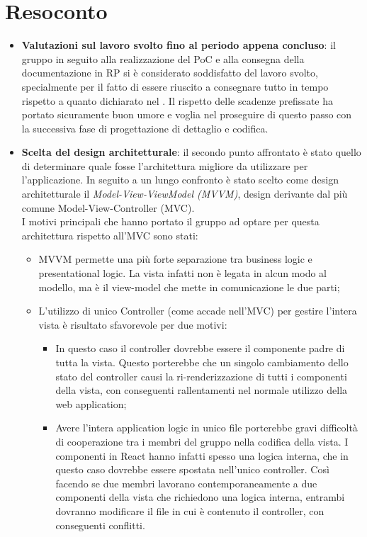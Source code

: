 \section{Resoconto}
\begin{itemize}
	\item \textbf{Valutazioni sul lavoro svolto fino al periodo appena concluso}: il gruppo in seguito alla realizzazione del PoC e alla consegna della documentazione in RP si è considerato soddisfatto del lavoro svolto, specialmente per il fatto di essere riuscito a consegnare tutto in tempo rispetto a quanto dichiarato nel \PdP{}. Il rispetto delle scadenze prefissate ha portato sicuramente buon umore e voglia nel proseguire di questo passo con la successiva fase di progettazione di dettaglio e codifica.
	\item \textbf{Scelta del design architetturale}: il secondo punto affrontato è stato quello di determinare quale fosse l'architettura migliore da utilizzare per l'applicazione. In seguito a un lungo confronto è stato scelto come design architetturale il \textit{Model-View-ViewModel (MVVM)}, design derivante dal più comune Model-View-Controller (MVC). \\
	I motivi principali che hanno portato il gruppo ad optare per questa architettura rispetto all'MVC sono stati:
	\begin{itemize}
		\item MVVM permette una più forte separazione tra business logic e presentational logic. La vista infatti non è legata in alcun modo al modello, ma è il view-model che mette in comunicazione le due parti;
		\item L'utilizzo di unico Controller (come accade nell'MVC) per gestire l'intera vista è risultato sfavorevole per due motivi: 
		\begin{itemize}
			\item In questo caso il controller dovrebbe essere il componente padre di tutta la vista. Questo porterebbe che un singolo cambiamento dello stato del controller causi la ri-renderizzazione di tutti i componenti della vista, con conseguenti rallentamenti nel normale utilizzo della web application; 
			\item Avere l'intera application logic in unico file porterebbe gravi difficoltà di cooperazione tra i membri del gruppo nella codifica della vista. I componenti in React hanno infatti spesso una logica interna, che in questo caso dovrebbe essere spostata nell'unico controller. Così facendo se due membri lavorano contemporaneamente a due componenti della vista che richiedono una logica interna, entrambi dovranno modificare il file in cui è contenuto il controller, con conseguenti conflitti.

\end{itemize}
\end{itemize}
\end{itemize}
